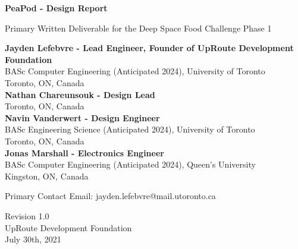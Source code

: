 \documentclass{report}
\begin{document}
\begin{titlepage}
    \begin{center}
        \vspace*{1.2cm}

        \textbf{\large{PeaPod - Design Report}}

        \vspace{0.5cm}

        Primary Written Deliverable for the Deep Space Food Challenge Phase 1

        \vfill \small{

            \textbf{Jayden Lefebvre - Lead Engineer, Founder of UpRoute Development Foundation}\\
            BASc Computer Engineering (Anticipated 2024), University of Toronto\\
            Toronto, ON, Canada\\
            \vspace{.5cm}
            \textbf{Nathan Chareunsouk - Design Lead}\\Toronto, ON, Canada\\
            \vspace{.5cm}
            \textbf{Navin Vanderwert - Design Engineer}\\
            BASc Engineering Science (Anticipated 2024), University of Toronto\\
            Toronto, ON, Canada\\
            \vspace{.5cm}
            \textbf{Jonas Marshall - Electronics Engineer}\\
            BASc Computer Engineering (Anticipated 2024), Queen's University\\
            Kingston, ON, Canada

        }

        \vspace{1cm}

        Primary Contact Email: jayden.lefebvre@mail.utoronto.ca

        \vspace{.75cm}

        Revision 1.0\\
        UpRoute Development Foundation\\
        July 30th, 2021

    \end{center}
\end{titlepage}

\thispagestyle{plain}
\end{document}
